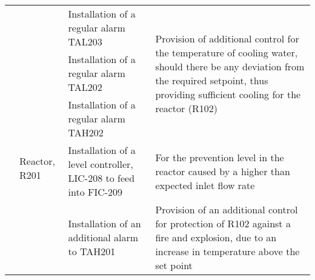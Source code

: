 \begin{table}[h]
\begin{tabularx}{\linewidth}{@{}lp{3cm}XX@{}}
     &                           & Installation of a regular alarm TAL203                                                                                                                        & \multirow[t]{3}{=}{Provision of additional control for the temperature of cooling water, should there be any deviation from the required setpoint, thus providing sufficient cooling for the reactor (R102)} \\ \cmidrule(lr){3-3}
     &                           & Installation of a regular alarm TAL202                                                                                                                        &                                                                                                                                                                                                                                                         \\
     &                           & Installation of a regular alarm TAH202                                                                                                                        &                                                                                                                                                                                                                                                         \\ \cmidrule(l){2-4} 
     & Reactor, R201             & \multirow[t]{2}{=}{Installation of a level controller, LIC-208 to feed into FIC-209}                                                                          & \multirow[t]{2}{=}{For the prevention level in the reactor caused by a higher than expected inlet flow rate}                                                                                                     \\
     &                           &                                                                                                                                                               &                                                                                                                                                                                                                                                         \\ \cmidrule(l){3-4} 
     &                           & \multirow[t]{2}{=}{Installation of an additional alarm to TAH201}                                                                                             & \multirow[t]{2}{=}{Provision of an additional control for protection of R102 against a fire and explosion, due to an increase in temperature above the set point}                                           \\

\end{tabularx}
\end{table}
